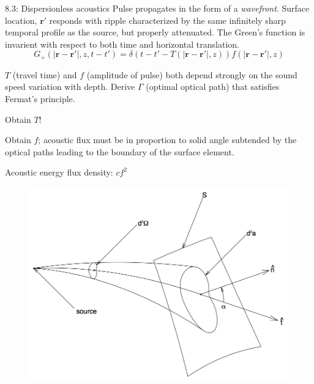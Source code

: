 \documentclass{beamer}
\begin{document}
\begin{frame}{8.3: Dispersionless acoustics}
    Pulse propagates in the form of a \emph{wavefront}.
    Surface location, $\mathbf{r}'$ responds with ripple characterized
    by the same infinitely sharp temporal profile as the source,
    but properly attenuated. The Green's function is invarient with
    respect to both time and horizontal translation.
    $$ G_{+}(|\mathbf{r}-\mathbf{r}'|,z,t-t') =
    \delta\left(t-t'-T\left(|\mathbf{r}-\mathbf{r}'|,z\right)\right)
       f\left(|\mathbf{r}-\mathbf{r}'|,z\right)$$
\end{frame}

\begin{frame}{8.4}
\end{frame}

\begin{frame}{8.5}
    $T$ (travel time) and $f$ (amplitude of pulse) both depend
    strongly on the sound speed variation with depth.
    Derive $\Gamma$ (optimal optical path) that satisfies
    Fermat's principle.

    Obtain $T$!
\end{frame}

\begin{frame}{8.6}
    Obtain $f$; acoustic flux must be in proportion to solid angle
    subtended by the optical paths leading to the boundary of the
    surface element.

    Acoustic energy flux density: $cf^{2}$
\end{frame}

\begin{frame}
    \begin{figure}
        \includegraphics[width=\textwidth]{fig_7.png}
    \end{figure}
\end{frame}
\end{document}
